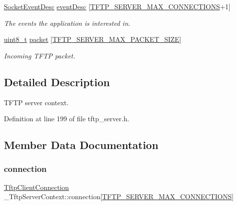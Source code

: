 \begin{DoxyCompactItemize}
\hyperlink{structSocketEventDesc}{Socket\+Event\+Desc} \hyperlink{struct__TftpServerContext_ae3e7783b2c32cdf0ef3b234a88819bbe}{event\+Desc} \mbox{[}\hyperlink{tftp__server_8h_a0acdd308af5bdb354e7a80dc8ff4388d}{T\+F\+T\+P\+\_\+\+S\+E\+R\+V\+E\+R\+\_\+\+M\+A\+X\+\_\+\+C\+O\+N\+N\+E\+C\+T\+I\+O\+NS}+1\mbox{]}
\begin{DoxyCompactList}\small\item\em The events the application is interested in. \end{DoxyCompactList}\item 
\hyperlink{stdint_8h_aba7bc1797add20fe3efdf37ced1182c5}{uint8\+\_\+t} \hyperlink{struct__TftpServerContext_a7f7fc903b14d60dccdd4229964e57ff7}{packet} \mbox{[}\hyperlink{tftp__server_8h_a691c548eb2ec25b559ea9029f36a5276}{T\+F\+T\+P\+\_\+\+S\+E\+R\+V\+E\+R\+\_\+\+M\+A\+X\+\_\+\+P\+A\+C\+K\+E\+T\+\_\+\+S\+I\+ZE}\mbox{]}
\begin{DoxyCompactList}\small\item\em Incoming T\+F\+TP packet. \end{DoxyCompactList}\end{DoxyCompactItemize}


\subsection{Detailed Description}
T\+F\+TP server context. 

Definition at line 199 of file tftp\+\_\+server.\+h.



\subsection{Member Data Documentation}
\mbox{\label{struct__TftpServerContext_a2af7d1036f98983f53ecd9ac32a38f01}} 
\subsubsection{\texorpdfstring{connection}{connection}}
{\footnotesize\ttfamily \hyperlink{tftp__server_8h_a0f645438c1de49e8bfc6960ef861e5c9}{Tftp\+Client\+Connection} \+\_\+\+Tftp\+Server\+Context\+::connection\mbox{[}\hyperlink{tftp__server_8h_a0acdd308af5bdb354e7a80dc8ff4388d}{T\+F\+T\+P\+\_\+\+S\+E\+R\+V\+E\+R\+\_\+\+M\+A\+X\+\_\+\+C\+O\+N\+N\+E\+C\+T\+I\+O\+NS}\mbox{]}}



